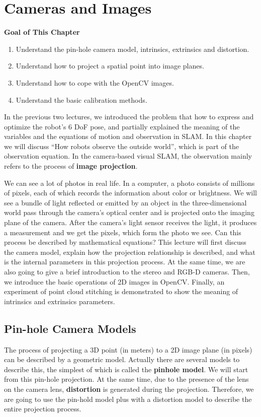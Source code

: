 \chapter{Cameras and Images}
\label{cpt:5}
\begin{mdframed}  
	\textbf{Goal of This Chapter}
	\begin{enumerate}[labelindent=0em,leftmargin=1.5em]
		\item Understand the pin-hole camera model, intrinsics, extrinsics and distortion. 
		\item Understand how to project a spatial point into image planes. 
		\item Understand how to cope with the OpenCV images. 
		\item Understand the basic calibration methods. 
	\end{enumerate}
\end{mdframed} 

In the previous two lectures, we introduced the problem that how to express and optimize the robot's 6 DoF pose, and partially explained the meaning of the variables and the equations of motion and observation in SLAM. In this chapter we will discuss ``How robots observe the outside world'', which is part of the observation equation. In the camera-based visual SLAM, the observation mainly refers to the process of \textbf{image projection}.

We can see a lot of photos in real life. In a computer, a photo consists of millions of pixels, each of which records the information about color or brightness. We will see a bundle of light reflected or emitted by an object in the three-dimensional world pass through the camera's optical center and is projected onto the imaging plane of the camera. After the camera's light sensor receives the light, it produces a measurement and we get the pixels, which form the photo we see. Can this process be described by mathematical equations? This lecture will first discuss the camera model, explain how the projection relationship is described, and what is the internal parameters in this projection process. At the same time, we are also going to give a brief introduction to the stereo and RGB-D cameras. Then, we introduce the basic operations of 2D images in OpenCV. Finally, an experiment of point cloud stitching is demonstrated to show the meaning of intrinsics and extrinsics parameters.

\newpage
\section{Pin-hole Camera Models}
The process of projecting a 3D point (in meters) to a 2D image plane (in pixels) can be described by a geometric model. Actually there are several models to describe this, the simplest of which is called the \textbf{pinhole model}. We will start from this pin-hole projection. At the same time, due to the presence of the lens on the camera lens, \textbf{distortion} is generated during the projection. Therefore, we are going to use the pin-hold model plus with a distortion model to describe the entire projection process.

